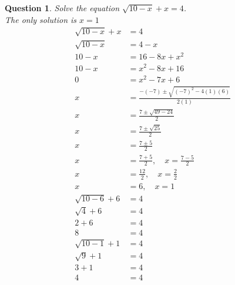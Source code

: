 \documentclass{article}
\newtheorem{question}{Question}
\begin{document}
	\newpage
	\begin{question}
		Solve the equation $\sqrt{10-x}+x=4$.\\
		The only solution is $x=\boxed{1}$\\
		$$\begin{aligned}
		\sqrt{10-x}+x&=4\\
		\sqrt{10-x}&=4-x\\
		10-x&=16-8x+x^2\\
		10-x&=x^2-8x+16\\
		0&=x^2-7x+6\\
		x&=\frac{-(-7)\pm\sqrt{(-7)^2-4(1)(6)}}{2(1)}\\
		x&=\frac{7\pm\sqrt{49-24}}{2}\\
		x&=\frac{7\pm\sqrt{25}}{2}\\
		x&=\frac{7\pm5}{2}\\
		x&=\frac{7+5}{2},\quad x=\frac{7-5}{2}\\
		x&=\frac{12}{2},\quad x=\frac{2}{2}\\
		x&=6,\quad x=1\\
		\sqrt{10-6}+6&=4\\
		\sqrt{4}+6&=4\\
		2+6&=4\\
		8&=4\\
		\sqrt{10-1}+1&=4\\
		\sqrt{9}+1&=4\\
		3+1&=4\\
		4&=4\\
		\end{aligned}$$
	\end{question}
\end{document}
